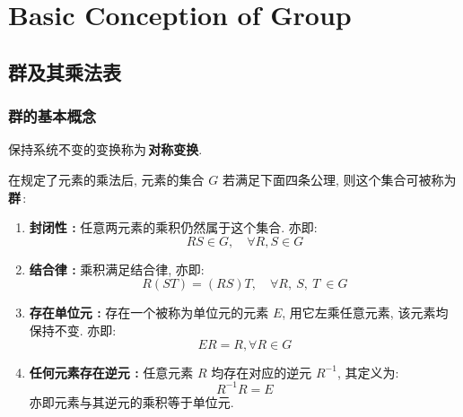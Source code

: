 \chapter{Basic Conception of Group}
\section{群及其乘法表}
    \subsection{群的基本概念}
        \begin{Concept}[对称变换]
            保持系统不变的变换称为\,\textbf{对称变换}.
        \end{Concept}

        \begin{Definition}[群]
            在规定了元素的乘法后, 元素的集合 $G$ 若满足下面四条公理, 则这个集合可被称为\,\textbf{群}\,:
            \begin{enumerate}
                \item \textbf{封闭性 :} 任意两元素的乘积仍然属于这个集合. 亦即:
                    \begin{equation}
                        RS \in G, \quad \forall R, S \in G
                    \end{equation}
                \item \textbf{结合律 :} 乘积满足结合律, 亦即:
                    \begin{equation}
                        R (ST) = (RS) T, \quad \forall R,\ S,\ T\ \in G
                    \end{equation}
                \item \textbf{存在单位元 :} 存在一个被称为单位元的元素 $E$, 用它左乘任意元素, 该元素均保持不变. 亦即:
                    \begin{equation}
                        ER = R, \forall R \in G
                    \end{equation}
                \item \textbf{任何元素存在逆元 :} 任意元素 $R$ 均存在对应的逆元 $R^{-1}$, 其定义为:
                    \begin{equation}
                        R^{-1} R = E
                    \end{equation}
                    亦即元素与其逆元的乘积等于单位元.
            \end{enumerate}
        \end{Definition}

